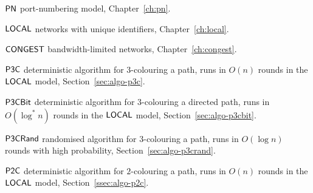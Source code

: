 
{\raggedright
\begin{notation}
    \item[$\textsf{PN}$] port-numbering model, Chapter~\ref{ch:pn}.
    \item[$\textsf{LOCAL}$] networks with unique identifiers, Chapter~\ref{ch:local}.
    \item[$\textsf{CONGEST}$] bandwidth-limited networks, Chapter~\ref{ch:congest}.
\end{notation}}


{\raggedright
\begin{algorithms}
    \item[$\textsf{P3C}$] deterministic algorithm for $3$-colouring a path, runs in $O(n)$ rounds in the $\textsf{LOCAL}$ model, Section~\ref{sec:algo-p3c}.
    \item[$\textsf{P3CBit}$] deterministic algorithm for $3$-colouring a directed path, runs in $O(\log^* n)$ rounds in the $\textsf{LOCAL}$ model, Section~\ref{sec:algo-p3cbit}.
    \item[$\textsf{P3CRand}$] randomised algorithm for $3$-colouring a path, runs in $O(\log n)$ rounds with high probability, Section~\ref{sec:algo-p3crand}.
    \item[$\textsf{P2C}$] deterministic algorithm for $2$-colouring a path, runs in $O(n)$ rounds in the $\textsf{LOCAL}$ model, Section~\ref{ssec:algo-p2c}.
\end{algorithms}}
